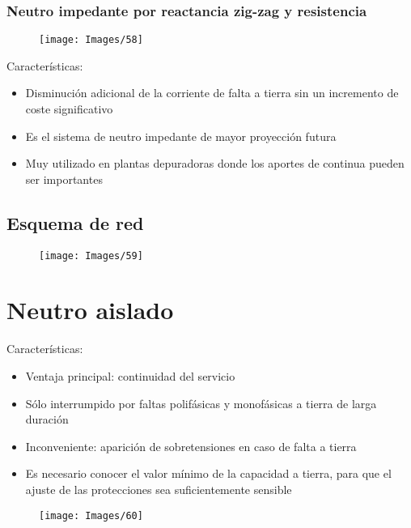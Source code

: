 \subsubsection{Neutro impedante por reactancia zig-zag y resistencia}
\begin{figure}[H]
	\centering
	\texttt{[image: Images/58]}
	\label{fig:58}
\end{figure}
Características:
\begin{itemize}
	\item Disminución adicional de la corriente de falta a tierra sin un incremento de coste significativo
	\item Es el sistema de neutro impedante de mayor proyección futura
	\item Muy utilizado en plantas depuradoras donde los aportes de continua pueden ser importantes
\end{itemize}
\subsection{Esquema de red}
\begin{figure}[H]
	\centering
	\texttt{[image: Images/59]}
	\label{fig:59}
\end{figure}

\section{Neutro aislado}
Características:
\begin{itemize}
	\item Ventaja principal: continuidad del servicio
	\item Sólo interrumpido por faltas polifásicas y monofásicas a tierra de larga duración
	\item Inconveniente: aparición de sobretensiones en caso de falta a tierra
	\item Es necesario conocer el valor mínimo de la capacidad a tierra, para que el ajuste de las protecciones sea suficientemente sensible
\end{itemize}
\begin{figure}[H]
	\centering
	\texttt{[image: Images/60]}
	\label{fig:60}
\end{figure}
